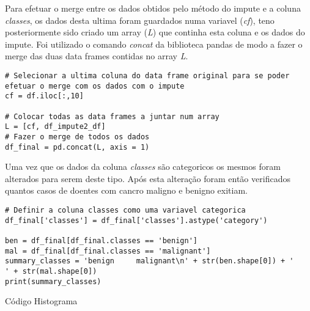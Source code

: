 \documentclass{article}
\begin{document}
Para efetuar o merge entre os dados obtidos pelo m\'etodo do impute e a coluna \textit{classes}, os dados desta ultima foram guardados numa variavel (\textit{cf}), teno posteriormente sido criado um array (\textit{L}) que continha esta coluna e os dados do impute.
Foi utilizado o comando \textit{concat} da biblioteca pandas de modo a fazer o merge das duas data frames contidas no array \textit{L}.

\begin{lstlisting}
# Selecionar a ultima coluna do data frame original para se poder efetuar o merge com os dados com o impute
cf = df.iloc[:,10]

# Colocar todas as data frames a juntar num array
L = [cf, df_impute2_df]
# Fazer o merge de todos os dados
df_final = pd.concat(L, axis = 1)
\end{lstlisting}

Uma vez que os dados da coluna \textit{classes} s\~ao categoricos os mesmos foram alterados para serem deste tipo. Ap\'os esta altera\c c\~ao foram ent\~ao verificados quantos casos de doentes com cancro maligno e benigno exitiam.

\begin{lstlisting}
# Definir a coluna classes como uma variavel categorica
df_final['classes'] = df_final['classes'].astype('category')

ben = df_final[df_final.classes == 'benign']
mal = df_final[df_final.classes == 'malignant']
summary_classes = 'benign     malignant\n' + str(ben.shape[0]) + '        ' + str(mal.shape[0])
print(summary_classes)
\end{lstlisting}

C\'odigo Histograma
\end{document}
